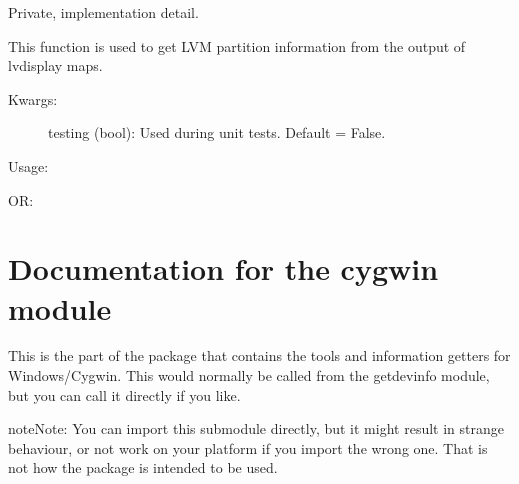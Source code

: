 \documentclass[letterpaper,10pt,english]{sphinxmanual}
\begin{document}

\begin{fulllineitems}
\label{\detokenize{linux:getdevinfo.linux.parse_lvm_output}}
Private, implementation detail.

This function is used to get LVM partition information from the
output of lvdisplay \textendash{}maps.
\begin{description}
\item[{Kwargs:}] \leavevmode
testing (bool):     Used during unit tests. Default = False.

\end{description}

Usage:

\begin{sphinxVerbatim}[commandchars=\\\{\}]
\end{sphinxVerbatim}

OR:

\begin{sphinxVerbatim}[commandchars=\\\{\}]
\end{sphinxVerbatim}

\end{fulllineitems}



\chapter{Documentation for the cygwin module}
\label{\detokenize{cygwin:module-getdevinfo.cygwin}}\label{\detokenize{cygwin:documentation-for-the-cygwin-module}}\label{\detokenize{cygwin::doc}}
This is the part of the package that contains the tools and information
getters for Windows/Cygwin. This would normally be called from the getdevinfo
module, but you can call it directly if you like.

\begin{sphinxadmonition}{note}{Note:}
You can import this submodule directly, but it might result
in strange behaviour, or not work on your platform if you
import the wrong one. That is not how the package is intended
to be used.
\end{sphinxadmonition}
\end{document}
